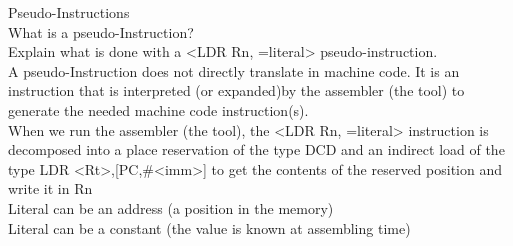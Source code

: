 \begin{example2}{Pseudo-Instructions}\\
What is a pseudo-Instruction? \\Explain what is done with a <LDR Rn, =literal> pseudo-instruction.
\vspace{2mm}\\
A pseudo-Instruction does not directly translate in machine code. It is an instruction that is interpreted (or expanded)by the assembler (the tool) to generate the needed machine code instruction(s).
\vspace{2mm}\\
When we run the assembler (the tool), the <LDR Rn, =literal> instruction is decomposed into a place reservation of the type DCD and an indirect load of the type LDR <Rt>,[PC,\#<imm>] to get the contents of the reserved position and write it in Rn
\vspace{2mm}\\
Literal can be an address (a position in the memory)\\
Literal can be a constant (the value is known at assembling time)
\end{example2}





